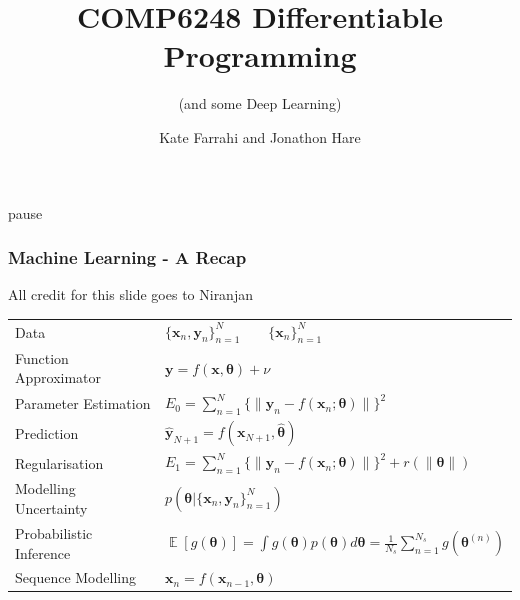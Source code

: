 \documentclass[\beamerclass]{beamer}
\title[COMP6248 Deep Learning]{COMP6248 Differentiable Programming}
\subtitle{(and some Deep Learning)}
\author{Kate Farrahi and Jonathon Hare}
\institute[]
{
  Vision, Learning and Control\\
  University of Southampton 
}
\date{}
\begin{document}
  \frame{
  \titlepage
}

\begin{frame}{pause}
\frametitle{Machine Learning - A Recap}
{\tiny All credit for this slide goes to Niranjan}\\
\vspace{5mm}
\begin{tabular}{ll}
Data & $\{\bm{x}_n, \bm{y}_n\}^N_{n=1} \qquad \{\bm{x}_n\}^N_{n=1}$ 
\vspace{3mm} \\ \pause
Function Approximator & $\bm{y} = f (\bm{x}, \bm{\theta}) + \nu$ 
\vspace{3mm} \\ \pause
Parameter Estimation & $E_0 = \sum^N_{n=1} \{\|\bm{y}_n - f (\bm{x}_n; \bm{\theta})\|\}^2$
\vspace{3mm} \\ \pause
Prediction & $\bm{\hat y}_{N+1} = f(\bm{x}_{N+1}, \bm{\hat \theta})$
\vspace{3mm} \\ \pause
Regularisation & $E_1 = \sum^N_{n=1} \{\|\bm{y}_n - f (\bm{x}_n; \bm{\theta})\|\}^2 + r(\|\bm\theta\|)$
\vspace{3mm} \\ \pause
Modelling Uncertainty & $p(\bm\theta|\{\bm x_n, \bm y_n\}_{n=1}^N)$
\vspace{3mm} \\ \pause
Probabilistic Inference & $\mathop{\mathbb{E}}[g(\bm\theta)] = \int g(\bm\theta)p(\bm\theta)d\bm\theta = \frac{1}{N_s}\sum_{n=1}^{N_s}g(\bm\theta^{(n)})$
\vspace{3mm} \\ \pause
Sequence Modelling & $\bm x_n = f(\bm x_{n-1}, \bm\theta)$
\end{tabular}
\vspace{5mm}
\end{frame}
\end{document}
